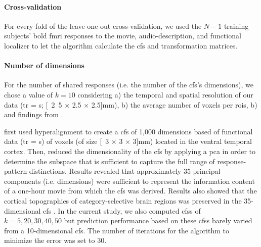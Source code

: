 \paragraph{Cross-validation}
%
For every fold of the leave-one-out cross-validation, we used the $N-1$ training
subjects' \ac{bold} \ac{fmri} responses to the movie, audio-description, and
functional localizer to let the algorithm calculate the \ac{cfs} and
transformation matrices.


\paragraph{Number of dimensions}

%
%

For the number of shared responses (i.e. the number of the \ac{cfs}'s
dimensions), we chose a value of $k=10$ considering a) the temporal and spatial
resolution of our data (\ac{tr} = \unit[2]{s}; \unit[2.5 $\times$ 2.5 $\times$
2.5]{mm}), b) the average number of voxels per \acp{roi}, b) and findings from
\citet{haxby2011common}.


\citet{haxby2011common} first used hyperalignment to create a \ac{cfs} of 1,000
dimensions based of functional data (\ac{tr} = \unit[3]{s}) of voxels (of size
\unit[3 $\times$ 3 $\times$ 3]{mm}) located in the ventral temporal cortex.
%
Then, \citet{haxby2011common} reduced the dimensionality of the \ac{cfs} by
applying a \ac{pca} in order to determine the subspace that is sufficient to
capture the full range of response-pattern distinctions.
%
Results revealed that approximately 35 principal components (i.e. dimensions)
were sufficient to represent the information content of a one-hour movie from
which the \ac{cfs} was derived.
%
Results also showed that the cortical topographies of category-selective brain
regions was preserved in the 35-dimensional \ac{cfs} \citep{haxby2011common}.
%
In the current study, we also computed \acp{cfs} of $k=5, 20, 30, 40, 50$ but
prediction performance based on these \acp{cfs} barely varied from a
10-dimensional \ac{cfs}.
The number of iterations for the algorithm to minimize the error was set to 30.


